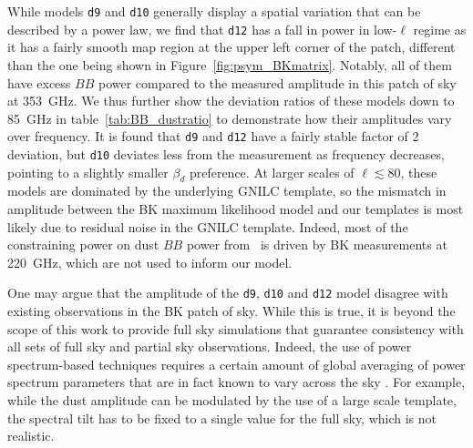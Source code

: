 \documentclass[twocolumn]{aastex631}
\begin{document}
While models \texttt{d9} and \texttt{d10} generally display a spatial variation that can be described by a power law, we find that \texttt{d12} has a fall in power in low-$\ell$ regime as it has a fairly smooth map region at the upper left corner of the patch, different than the one being shown in Figure~\ref{fig:psym_BKmatrix}. Notably, all of them have excess $BB$ power compared to the measured amplitude in this patch of sky at 353~GHz. We thus further show the deviation ratios of these models down to 85~GHz in table~\ref{tab:BB_dustratio} to demonstrate how their amplitudes vary over frequency. It is found that \texttt{d9} and \texttt{d12} have a fairly stable factor of 2 deviation, but \texttt{d10} deviates less from the measurement as frequency decreases, pointing to a slightly smaller $\beta_d$ preference. At larger scales of $\ell \lesssim 80$, these models are dominated by the underlying GNILC template, so the mismatch in amplitude between the BK maximum likelihood model and our templates is most likely due to residual noise in the GNILC template. Indeed, most of the constraining power on dust $BB$ power from~\cite{Ade:2021} is driven by BK measurements at 220~GHz, which are not used to inform our model.


One may argue that the amplitude of the \texttt{d9}, \texttt{d10} and \texttt{d12} model disagree with existing observations in the BK patch of sky. While this is true, it is beyond the scope of this work to provide full sky simulations that guarantee consistency with all sets of full sky and partial sky observations. Indeed, the use of power spectrum-based techniques requires a certain amount of global averaging of power spectrum parameters that are in fact known to vary across the sky \cite{planck2016-l04}. For example, while the dust amplitude can be modulated by the use of a large scale template, the spectral tilt has to be fixed to a single value for the full sky, which is not realistic. 
\end{document}
